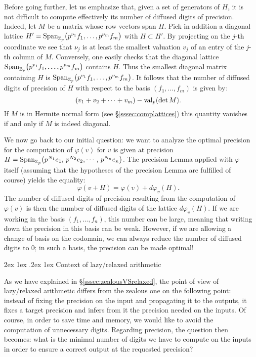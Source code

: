 \documentclass[11pt]{article}
\makeatletter
\numberwithin{equation}{section}
\numberwithin{figure}{section}
\renewcommand\paragraph{\@startsection{paragraph}{4}{\z@}%
                                    {2ex \@plus1ex \@minus.2ex}%
                                    {1ex}%
                                    {\normalfont\normalsize\bfseries}}
\theoremstyle{definition}
\newcommand{\Z}{\mathbb Z}
\newcommand{\Zp}{\Z_p}
\newcommand{\Span}{\text{\rm Span}}
\newcommand{\val}{\text{\rm val}}
\makeatother
\begin{document}
Before going further, let us emphasize that, given a set of generators 
of $H$, it is not difficult to compute effectively its number of 
diffused digits of precision. Indeed, let $M$ be a matrix whose row
vectors span $H$.
Pick in addition a diagonal lattice $H' = \Span_{\Zp} \big(p^{\nu_1} f_1, \ldots, 
p^{\nu_m} f_m\big)$ with $H \subset H'$. By projecting on the $j$-th 
coordinate we see that $\nu_j$ is at least the smallest valuation $v_j$ of 
an entry of the $j$-th column of $M$. Conversely, one easily checks that 
the diagonal lattice $\Span_{\Zp} \big(p^{v_1} f_1, \ldots, p^{v_m} 
f_m\big)$ contains $H$. Thus the smallest diagonal matrix containing $H$ 
is $\Span_{\Zp} \big(p^{v_1} f_1, \ldots, p^{v_m} f_m\big)$. It follows 
that the number of diffused digits of precision of $H$ with respect to 
the basis $(f_1, \ldots, f_m)$ is given by:
\begin{equation}
\label{eq:numberdiffused}
(v_1 + v_2 + \cdots + v_m) - \val_p(\det M).
\end{equation}
If $M$ is in Hermite normal form (see \S \ref{sssec:complattices}) this 
quantity vanishes if and only if $M$ is indeed diagonal.

\medskip

We now go back to our initial question: we want to analyze the optimal 
precision for the computation of $\varphi(v)$ for $v$ is given at 
precision $H = \Span_{\Zp} \big( p^{N_1} e_1, \, p^{N_2} e_2, \cdots, \, 
p^{N_n} e_n \big)$. The precision Lemma applied with $\varphi$ itself
(assuming that the hypotheses of the precision Lemma are fulfilled
of course) yields the equality:
$$\varphi(v+H) = \varphi(v) + d\varphi_v(H).$$
The number of diffused digits of precision resulting from the computation 
of $\varphi(v)$ is then the number of diffused digits of the lattice
$d\varphi_v(H)$. If we are working in the basis $(f_1, \ldots, f_n)$,
this number can be large, meaning that writing down the precision in 
this basis can be weak. However, if we are allowing a change of basis on 
the codomain, we can always reduce the number of diffused digits to $0$; 
in such a basis, the precision can be made optimal!

\paragraph{Context of lazy/relaxed arithmetic}

As we have explained in \S \ref{sssec:zealousVSrelaxed}, the point of 
view of lazy/relaxed arithmetic differs from the zealous one on the 
following point: instead of fixing the precision on the input and 
propagating it to the outputs, it fixes a target precision and infers 
from it the precision needed on the inputs.
Of course, in order to save time and memory, we would like to avoid 
the computation of unnecessary digits. Regarding precision, the
question then becomes: what is the minimal number of digits we have
to compute on the inputs in order to ensure a correct output at the
requested precision?
\end{document}

